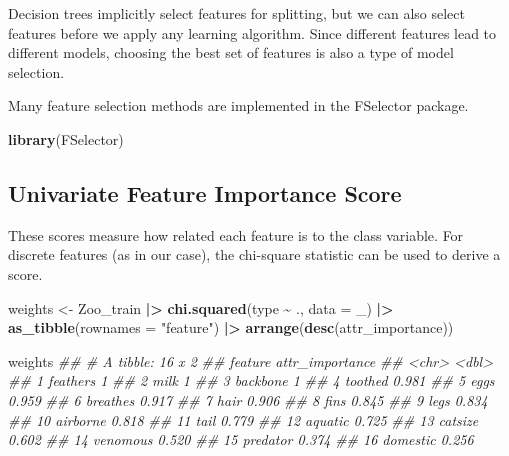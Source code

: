 \documentclass[
  notitlepage]{book}
\newenvironment{Shaded}{\begin{snugshade}}{\end{snugshade}}
\newcommand{\CommentTok}[1]{\textcolor[rgb]{0.56,0.35,0.01}{\textit{#1}}}
\newcommand{\DataTypeTok}[1]{\textcolor[rgb]{0.13,0.29,0.53}{#1}}
\newcommand{\ErrorTok}[1]{\textcolor[rgb]{0.64,0.00,0.00}{\textbf{#1}}}
\newcommand{\KeywordTok}[1]{\textcolor[rgb]{0.13,0.29,0.53}{\textbf{#1}}}
\newcommand{\NormalTok}[1]{#1}
\newcommand{\OperatorTok}[1]{\textcolor[rgb]{0.81,0.36,0.00}{\textbf{#1}}}
\newcommand{\StringTok}[1]{\textcolor[rgb]{0.31,0.60,0.02}{#1}}
\begin{document}
Decision trees implicitly select features for splitting, but we can also
select features before we apply any learning algorithm.
Since different features lead to different models, choosing
the best set of features is also a type of
model selection.

Many feature selection methods are implemented in the FSelector package.

\begin{Shaded}
\begin{Highlighting}[]
\KeywordTok{library}\NormalTok{(FSelector)}
\end{Highlighting}
\end{Shaded}

\hypertarget{univariate-feature-importance-score}{%
\subsection{Univariate Feature Importance Score}\label{univariate-feature-importance-score}}

These scores measure how related each feature is to the class variable.
For discrete features (as in our case), the chi-square statistic can be
used to derive a score.

\begin{Shaded}
\begin{Highlighting}[]
\NormalTok{weights \textless{}{-}}\StringTok{ }\NormalTok{Zoo\_train }\OperatorTok{|}\ErrorTok{\textgreater{}}\StringTok{ }
\StringTok{  }\KeywordTok{chi.squared}\NormalTok{(type }\OperatorTok{\textasciitilde{}}\StringTok{ }\NormalTok{., }\DataTypeTok{data =}\NormalTok{ \_) }\OperatorTok{|}\ErrorTok{\textgreater{}}
\StringTok{  }\KeywordTok{as\_tibble}\NormalTok{(}\DataTypeTok{rownames =} \StringTok{"feature"}\NormalTok{) }\OperatorTok{|}\ErrorTok{\textgreater{}}
\StringTok{  }\KeywordTok{arrange}\NormalTok{(}\KeywordTok{desc}\NormalTok{(attr\_importance))}

\NormalTok{weights}
\CommentTok{\#\# \# A tibble: 16 x 2}
\CommentTok{\#\#    feature  attr\_importance}
\CommentTok{\#\#    \textless{}chr\textgreater{}              \textless{}dbl\textgreater{}}
\CommentTok{\#\#  1 feathers           1    }
\CommentTok{\#\#  2 milk               1    }
\CommentTok{\#\#  3 backbone           1    }
\CommentTok{\#\#  4 toothed            0.981}
\CommentTok{\#\#  5 eggs               0.959}
\CommentTok{\#\#  6 breathes           0.917}
\CommentTok{\#\#  7 hair               0.906}
\CommentTok{\#\#  8 fins               0.845}
\CommentTok{\#\#  9 legs               0.834}
\CommentTok{\#\# 10 airborne           0.818}
\CommentTok{\#\# 11 tail               0.779}
\CommentTok{\#\# 12 aquatic            0.725}
\CommentTok{\#\# 13 catsize            0.602}
\CommentTok{\#\# 14 venomous           0.520}
\CommentTok{\#\# 15 predator           0.374}
\CommentTok{\#\# 16 domestic           0.256}
\end{Highlighting}
\end{Shaded}
\end{document}
